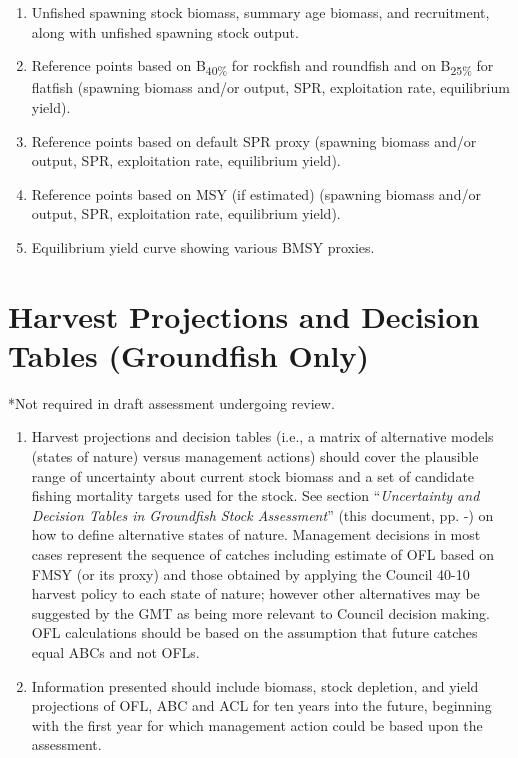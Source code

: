 \documentclass[12pt,]{article}
\begin{document}
\begin{enumerate}
\def\labelenumi{\arabic{enumi}.}
\itemsep1pt\parskip0pt
\item
  Unfished spawning stock biomass, summary age biomass, and recruitment,
  along with unfished spawning stock output.
\item
  Reference points based on B\textsubscript{40\%} for rockfish and
  roundfish and on B\textsubscript{25\%} for flatfish (spawning biomass
  and/or output, SPR, exploitation rate, equilibrium yield).
\item
  Reference points based on default SPR proxy (spawning biomass and/or
  output, SPR, exploitation rate, equilibrium yield).
\item
  Reference points based on MSY (if estimated) (spawning biomass and/or
  output, SPR, exploitation rate, equilibrium yield).
\item
  Equilibrium yield curve showing various BMSY proxies.
\end{enumerate}

\section{Harvest Projections and Decision Tables (Groundfish
Only)}\label{harvest-projections-and-decision-tables-groundfish-only}

*Not required in draft assessment undergoing review.

\begin{enumerate}
\def\labelenumi{\arabic{enumi}.}
\item
  Harvest projections and decision tables (i.e., a matrix of alternative
  models (states of nature) versus management actions) should cover the
  plausible range of uncertainty about current stock biomass and a set
  of candidate fishing mortality targets used for the stock. See section
  ``\textit{Uncertainty and Decision Tables in Groundfish Stock Assessment}''
  (this document, pp.
  \pageref{sec:uncertainty}-\pageref{sec:uncertaintylast}) on how to
  define alternative states of nature. Management decisions in most
  cases represent the sequence of catches including estimate of OFL
  based on FMSY (or its proxy) and those obtained by applying the
  Council 40-10 harvest policy to each state of nature; however other
  alternatives may be suggested by the GMT as being more relevant to
  Council decision making. OFL calculations should be based on the
  assumption that future catches equal ABCs and not OFLs.
\item
  Information presented should include biomass, stock depletion, and
  yield projections of OFL, ABC and ACL for ten years into the future,
  beginning with the first year for which management action could be
  based upon the assessment.
\end{enumerate}
\end{document}
